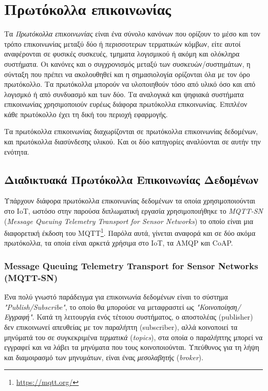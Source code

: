 \section{Πρωτόκολλα επικοινωνίας}
\label{sec:theory_protocols}

Τα \textit{Πρωτόκολλα επικοινωνίας} είναι ένα σύνολο κανόνων που ορίζουν το μέσο και τον τρόπο επικοινωνίας μεταξύ δύο ή περισσοτερων τερματικών κόμβων, είτε αυτοί αναφέρονται σε φυσικές συσκευές, τμηματα λογισμικού ή ακόμη και ολόκληρα συστήματα. Οι κανόνες και ο συγχρονισμός μεταξύ των συσκευών/συστημάτων, η σύνταξη που πρέπει να ακολουθηθεί και η σημασιολογία ορίζονται όλα με τον όρο πρωτόκολλο. Τα πρωτόκολλα μπορούν να υλοποιηθούν τόσο από υλικό όσο και από λογισμκό ή από συνδυασμό και των δύο. Τα αναλογικά και ψηφιακά συστήματα επικοινωνίας χρησιμοποιούν ευρέως διάφορα πρωτόκολλα επικοινωνίας. Επιπλέον κάθε πρωτόκολλο έχει τη δική του περιοχή εφαρμογής.

Τα πρωτόκολλα επικοινωνίας διαχωρίζονται σε πρωτόκολλα επικοινωνίας δεδομένων, και πρωτόκολλα διασύνδεσης υλικού. Και οι δύο κατηγορίες αναλύονται σε αυτήν την ενότητα.

\subsection{Διαδικτυακά Πρωτόκολλα Επικοινωνίας Δεδομένων}
\label{subsec:com_protocols}

Υπάρχουν διάφορα πρωτόκολλα επικοινωνίας δεδομένων τα οποία χρησιμοποιούνται στο IoT, ωστόσο στην παρούσα διπλωματική εργασία χρησιμοποιήθηκε το \textit{MQTT-SN} (\textit{Message Queuing Telemetry Transport for Sensor Networks}) το οποίο είναι μια διαφορετική έκδοση του MQTT\footnote{\url{https://mqtt.org/}}. Παρόλα αυτά, γίνεται αναφορά και σε δύο ακόμα πρωτόκολλα, τα οποία είναι αρκετά χρήσιμα στο IoT, τα AMQP και CoAP.

\subsubsection{Message Queuing Telemetry Transport for Sensor Networks (MQTT-SN)}
\label{subsubsec:mqtt}

Ένα πολύ γνωστό παράδειγμα για επικοινωνία δεδομένων είναι το σύστημα \textit{"Publish/Subscribe"}, το οποίο θα μπορούσε να μεταφραστεί ως \textit{"Κοινοποίηση/Εγγραφή"}. Κατά τη λειτουργία ενός τέτοιου συστήματος, ο αποστολέας (publisher) δεν επικοινωνεί απευθείας με τον παραλήπτη (subscriber), αλλά κοινοποιεί τα μηνύματά του σε συγκεκριμένα \textit{τερματικά} (\textit{topics}), στα οποία ο παραλήπτης μπορεί να εγγραφεί και να λάβει τα μηνύματα που τους κοινοποιούνται. Υπεύθυνος για τη λήψη και διαμοιρασμό των μηνυμάτων, είναι ένας \textit{μεσολαβητής} (\textit{broker}).

